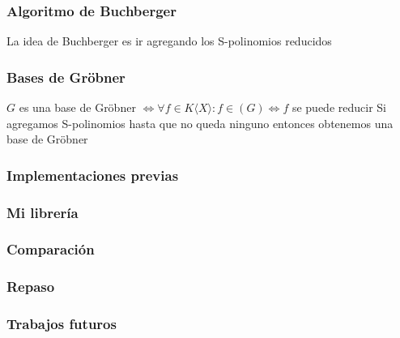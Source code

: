 \documentclass[spanish, aspectratio=169]{beamer}
\begin{document}
\begin{frame}
  \frametitle{Algoritmo de Buchberger}

  La idea de Buchberger es ir agregando los S-polinomios reducidos
\end{frame}

\begin{frame}
  \frametitle{Bases de Gröbner}
  $G$ es una base de Gröbner $⇔ ∀f ∈ K⟨X⟩ : f ∈ (G) ⇔ f$ se puede reducir
  Si agregamos S-polinomios hasta que no queda ninguno entonces obtenemos una base de Gröbner
\end{frame}

\begin{frame}
  \frametitle{Implementaciones previas}
\end{frame}

\begin{frame}
  \frametitle{Mi librería}
\end{frame}

\begin{frame}
  \frametitle{Comparación}
\end{frame}

\begin{frame}
  \frametitle{Repaso}
\end{frame}

\begin{frame}
  \frametitle{Trabajos futuros}
\end{frame}
\end{document}
